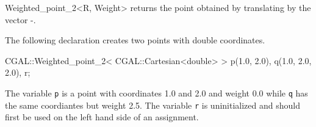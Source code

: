 \begin{ccRefClass} {Weighted_point_2<R, Weight>}
       {returns the point obtained by translating  by the 
        vector -.}

\ccExample

The following declaration creates two points with  double coordinates.

\begin{cprog}

  CGAL::Weighted_point_2< CGAL::Cartesian<double> > p(1.0, 2.0), q(1.0, 2.0, 2.0), r;
\end{cprog} 

The variable \texttt{p} is a point with 
coordinates 1.0 and 2.0 and weight 0.0 while \texttt{q} has the same 
coordiantes but weight 2.5.
The variable {\tt r} is uninitialized and should first be used on 
the left hand side of an assignment. 

\ccSeeAlso
{} \\

\end{ccRefClass} 
